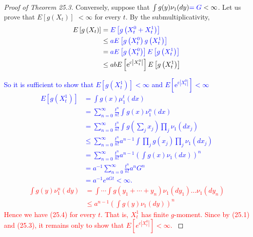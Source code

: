 \documentclass[a4paper,11pt]{article}
\begin{document}
\begin{proof}[Proof of Theorem 25.3]
    Conversely, suppose that $\int g(y) \nu_{1}(dy) \textcolor{blue}{= G}<\infty$. Let us prove
    that $E\left[g\left(X_{t}\right)\right]$ $<\infty$ for every $t$. By the submultiplicativity,
    \begin{align*}
        E\left[g\left(X_{t}\right)\right] & =  \textcolor{blue}{E\left[g\left(X_{t}^{0} + X_{t}^{1}\right)\right]}                                    \\
                                          & \leq \textcolor{blue}{aE\left[ g\left(X_{t}^{0}\right) g\left(X_{t}^{1}\right)\right]}                    \\
                                          & = \textcolor{blue}{aE\left[ g\left(X_{t}^{0}\right)\right]  E\left[ g\left(X_{t}^{1}\right)\right]}       \\
                                          & \le a b E\left[\mathrm{e}^{\mathrm{c}\left|X_{t}^{0}\right|}\right] E\left[g\left(X_{t}^{1}\right)\right]
    \end{align*}

    \textcolor{blue}{So it is sufficient to show that $E\left[g\left(X_{t}^{1}\right) \right]<\infty$ and
    $E\left[\mathrm{e}^{\mathrm{c}\left|X_{t}^{0}\right|}\right] < \infty$
    \begin{align*}
        E[g(X^{1}_{t})] & = \int g(x) \mu _{1} ^{t}(dx)                                                                                            \\
                        & =\sum_{n=0}^{\infty} \frac{t^{n}}{n !} \int g(x) \nu_{1}^{n}(dx)                                                         \\
                        & =\sum_{n=0}^{\infty} \frac{t^{n}}{n !} \int g\left(\sum_{j} x_{j}\right) \prod_{j}\nu_{1}\left(dx_{j}\right)             \\
                        & \le \sum_{n=0}^{\infty} \frac{t^{n}}{n !} a^{n-1}\int \prod_{j} g\left(x_{j}\right) \prod_{j} \nu_{1}\left(dx_{j}\right) \\
                        & =\sum_{n=0}^{\infty} \frac{t^{n}}{n !} a^{n-1} \left(\int g(x) \nu_{1}(dx)\right)^{n}                                    \\
                        & =a^{-1}\sum_{n=0}^{\infty} \frac{t^{n}}{n !} a^{n} G^{n}                                                                 \\
                        & = a^{-1} e^{aGt} < \infty.
    \end{align*}
    }
    \textcolor{red}{
    $$
        \begin{aligned}
            \int g(y) \nu_{1}^{n}(dy) & =\int \cdots \int g\left(y_{1}+\cdots+y_{n}\right) \nu_{1}\left(dy_{1}\right) \ldots \nu_{1}\left(d y_{n}\right) \\
                                      & \leq a^{n-1}\left(\int g(y) \nu_{1}(dy)\right)^{n}
        \end{aligned}
    $$
    Hence we have (25.4) for every $t$. That is, $X_{t}^{1}$ has finite $g$-moment.
    Since by (25.1) and (25.3), it remains only to show that $E\left[e^{c |X_{t}^{0}| }\right]<\infty$.
    }


\end{proof}
\end{document}

